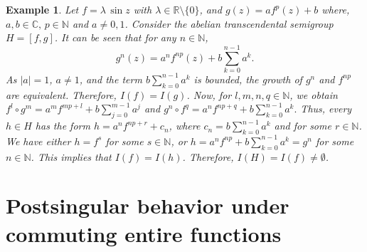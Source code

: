 \documentclass[a4paper,12pt]{amsart}
\newcommand{\N}{\mathbb{N}}
\numberwithin{equation}{section}
\newtheorem{example}[theorem]{Example}
\begin{document}
	\begin{example}\label{ex 1}
		Let $f=\lambda \, \sin z$ with $\lambda \in \mathbb{R}\setminus \{0\}$, and $g(z) = af^p(z) +b$ where, $ a,b \in \mathbb{C},\,  p\in \mathbb{N} $ and $a \neq 0,1$. Consider the abelian transcendental semigroup $H=[f,g]$. It can be seen that for any $n \in \mathbb{N}$, 
		\[
		g^n(z) = a^n f^{np}(z) + b \sum_{k=0}^{n-1} a^k.
		\]
	As $|a|=1$, $a\neq 1$, and the term $b \sum_{k=0}^{n-1} a^k$ is bounded, the growth of $g^n$ and $f^{np}$ are equivalent. Therefore, $I(f)=I(g)$. Now, for $l,m,n,q \in \mathbb{N}$, we obtain 
		$f^l\circ g^m = a^m f^{mp+l} + b \sum_{j=0}^{m-1} a^j$
		and
		$
		g^n\circ f^q = a^n f^{np+q} + b \sum_{k=0}^{n-1} a^k.
		$
		Thus, every $h \in H$ has the form $h = a^n f^{np+r} + c_n$, where $c_n = b \sum_{k=0}^{n-1} a^k$ and for some $r\in \N$. We have either
		$h = f^s$ for some $s \in \mathbb{N}$, or
		$h = a^n f^{np}+ b \sum_{k=0}^{n-1} a^k = g^n$
		for some $n \in \mathbb{N}$. This implies that $I(f)= I(h)$. Therefore, $I(H)=I(f)\neq \emptyset$.
	\end{example}
	\section{Postsingular behavior under commuting entire functions}\label{sec4}
	
\end{document}
